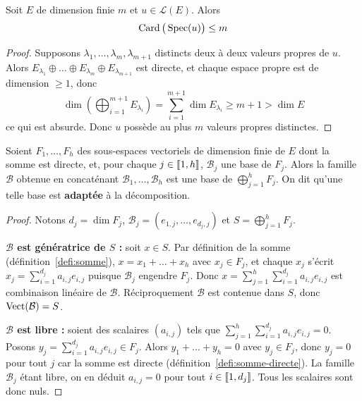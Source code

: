 \begin{coro}
\label{coro:card-spec}
Soit $E$ de dimension finie $m$ et $u\in\mathcal{L}(E)$. Alors
\[\operatorname{Card}\big(\operatorname{Spec}(u)\big) \leq m\]
\end{coro}

\begin{proof}
Supposons $\lambda_1,\dots,\lambda_m,\lambda_{m+1}$ distincts deux à deux valeurs propres de $u$. Alors $E_{\lambda_1}\oplus\dots\oplus E_{\lambda_m}\oplus E_{\lambda_{m+1}}$ est directe, et chaque espace propre est de dimension $\geq 1$, donc
\[\dim\left(\bigoplus_{i=1}^{m+1} E_{\lambda_i}\right) = \sum_{i=1}^{m+1}\dim E_{\lambda_i} \geq m+1 > \dim E\]
ce qui est absurde. Donc $u$ possède au plus $m$ valeurs propres distinctes.
\end{proof}

\begin{lemme}
\label{lemme:base-adaptee}
Soient $F_1,\dots,F_h$ des sous-espaces vectoriels de dimension finie de $E$ dont la somme est directe, et, pour chaque $j\in\llbracket 1,h \rrbracket$, $\mathcal{B}_j$ une base de $F_j$. Alors la famille $\mathcal{B}$ obtenue en concaténant $\mathcal{B}_1,\dots,\mathcal{B}_h$ est une base de $\displaystyle\bigoplus_{j=1}^{h} F_j$. On dit qu'une telle base est \textbf{adaptée} à la décomposition.
\end{lemme}

\begin{proof}
Notons $d_j=\dim F_j$, $\mathcal{B}_j=(e_{1,j},\dots,e_{d_j,j})$ et $S=\bigoplus_{j=1}^{h}F_j$.

\textbf{$\mathcal{B}$ est génératrice de $S$ :} soit $x\in S$. Par définition de la somme (définition~\ref{defi:somme}), $x=x_1+\dots+x_h$ avec $x_j\in F_j$, et chaque $x_j$ s'écrit $x_j=\sum_{i=1}^{d_j}a_{i,j}e_{i,j}$ puisque $\mathcal{B}_j$ engendre $F_j$. Donc $x=\sum_{j=1}^{h}\sum_{i=1}^{d_j}a_{i,j}e_{i,j}$ est combinaison linéaire de $\mathcal{B}$. Réciproquement $\mathcal{B}$ est contenue dans $S$, donc $\operatorname{Vect}(\mathcal{B})=S$.

\textbf{$\mathcal{B}$ est libre :} soient des scalaires $(a_{i,j})$ tels que $\sum_{j=1}^{h}\sum_{i=1}^{d_j}a_{i,j}e_{i,j}=0$. Posons $y_j=\sum_{i=1}^{d_j}a_{i,j}e_{i,j}\in F_j$. Alors $y_1+\dots+y_h=0$ avec $y_j\in F_j$, donc $y_j=0$ pour tout $j$ car la somme est directe (définition~\ref{defi:somme-directe}). La famille $\mathcal{B}_j$ étant libre, on en déduit $a_{i,j}=0$ pour tout $i\in\llbracket 1,d_j \rrbracket$. Tous les scalaires sont donc nuls.
\end{proof}


